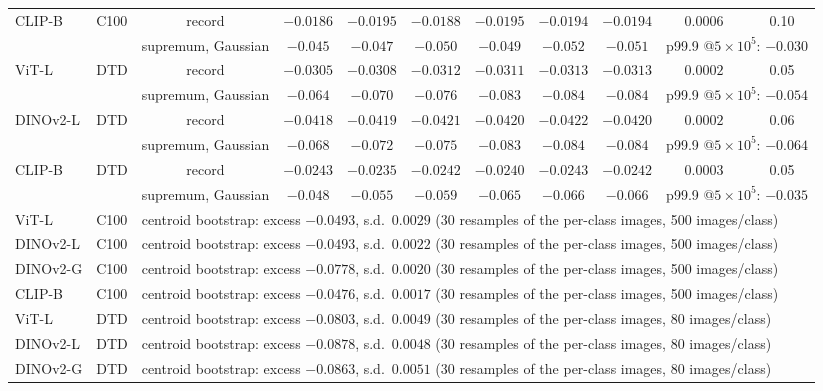 \begin{table}[H]
\begin{tabular}{llccccccc|cc}
CLIP-B & C100 & record & $-0.0186$ & $-0.0195$ & $-0.0188$ & $-0.0195$ & $-0.0194$ & $-0.0194$ & $0.0006$ & 0.10 \\
 & & supremum, Gaussian & $-0.045$ & $-0.047$ & $-0.050$ & $-0.049$ & $-0.052$ & $-0.051$ & \multicolumn{2}{l}{p99.9 @$5{\times}10^5$: $-0.030$} \\
ViT-L & DTD & record & $-0.0305$ & $-0.0308$ & $-0.0312$ & $-0.0311$ & $-0.0313$ & $-0.0313$ & $0.0002$ & 0.05 \\
 & & supremum, Gaussian & $-0.064$ & $-0.070$ & $-0.076$ & $-0.083$ & $-0.084$ & $-0.084$ & \multicolumn{2}{l}{p99.9 @$5{\times}10^5$: $-0.054$} \\
DINOv2-L & DTD & record & $-0.0418$ & $-0.0419$ & $-0.0421$ & $-0.0420$ & $-0.0422$ & $-0.0420$ & $0.0002$ & 0.06 \\
 & & supremum, Gaussian & $-0.068$ & $-0.072$ & $-0.075$ & $-0.083$ & $-0.084$ & $-0.084$ & \multicolumn{2}{l}{p99.9 @$5{\times}10^5$: $-0.064$} \\
CLIP-B & DTD & record & $-0.0243$ & $-0.0235$ & $-0.0242$ & $-0.0240$ & $-0.0243$ & $-0.0242$ & $0.0003$ & 0.05 \\
 & & supremum, Gaussian & $-0.048$ & $-0.055$ & $-0.059$ & $-0.065$ & $-0.066$ & $-0.066$ & \multicolumn{2}{l}{p99.9 @$5{\times}10^5$: $-0.035$} \\
ViT-L & C100 & \multicolumn{9}{l}{centroid bootstrap: excess $-0.0493$, s.d.\ $0.0029$ (30 resamples of the per-class images, 500 images/class)} \\
DINOv2-L & C100 & \multicolumn{9}{l}{centroid bootstrap: excess $-0.0493$, s.d.\ $0.0022$ (30 resamples of the per-class images, 500 images/class)} \\
DINOv2-G & C100 & \multicolumn{9}{l}{centroid bootstrap: excess $-0.0778$, s.d.\ $0.0020$ (30 resamples of the per-class images, 500 images/class)} \\
CLIP-B & C100 & \multicolumn{9}{l}{centroid bootstrap: excess $-0.0476$, s.d.\ $0.0017$ (30 resamples of the per-class images, 500 images/class)} \\
ViT-L & DTD & \multicolumn{9}{l}{centroid bootstrap: excess $-0.0803$, s.d.\ $0.0049$ (30 resamples of the per-class images, 80 images/class)} \\
DINOv2-L & DTD & \multicolumn{9}{l}{centroid bootstrap: excess $-0.0878$, s.d.\ $0.0048$ (30 resamples of the per-class images, 80 images/class)} \\
DINOv2-G & DTD & \multicolumn{9}{l}{centroid bootstrap: excess $-0.0863$, s.d.\ $0.0051$ (30 resamples of the per-class images, 80 images/class)} \\

\end{tabular}
\end{table}
